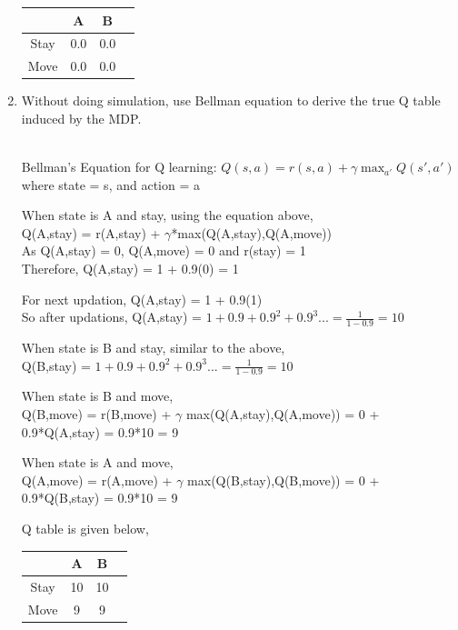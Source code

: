 \documentclass[a4paper]{article}
\theoremstyle{definition}
\newenvironment{soln}{
    \leavevmode\color{blue}\ignorespaces
}{}
\begin{document}
\begin{enumerate}
\begin{soln}

\begin{center}
\begin{tabular}{c|ccc}
& A & B \\\hline
Stay&0.0&0.0&\\
Move&0.0&0.0&
\end{tabular}
\end{center}
	
\end{soln}

\item Without doing simulation, use Bellman equation to derive the true Q table induced by the MDP.

\begin{soln}
\\Bellman's Equation for Q learning: $Q(s,a) = r(s,a) + \gamma \max_{a'}Q(s',a')$ where state = s, and action = a

When state is A and stay, using the equation above,
\\Q(A,stay) = r(A,stay) + $\gamma$*max(Q(A,stay),Q(A,move)) 
\\As Q(A,stay) = 0, Q(A,move) = 0 and r(stay) = 1
\\Therefore, Q(A,stay) =   1 + 0.9(0) = 1 

For next updation, Q(A,stay) = 1 + 0.9(1)
\\So after updations, Q(A,stay) = $1 + 0.9 + 0.9^2 + 0.9^3 ... = \frac{1}{1-0.9} = 10$

When state is B and stay, similar to the above,
\\Q(B,stay) = $1 + 0.9 + 0.9^2 + 0.9^3 ... = \frac{1}{1-0.9} = 10$
 
When state is B and move,
\\Q(B,move) = r(B,move) + $\gamma$ max(Q(A,stay),Q(A,move)) = 0 + 0.9*Q(A,stay) = 0.9*10 = 9

When state is A and move,
\\Q(A,move) = r(A,move) + $\gamma$ max(Q(B,stay),Q(B,move)) = 0 + 0.9*Q(B,stay) = 0.9*10 = 9
	
Q table is given below,
	
\begin{center}
\begin{tabular}{c|ccc}
& A & B \\\hline
Stay&10&10&\\
Move&9&9&
\end{tabular}
\end{center}

\end{soln}


\end{enumerate}
\end{document}
